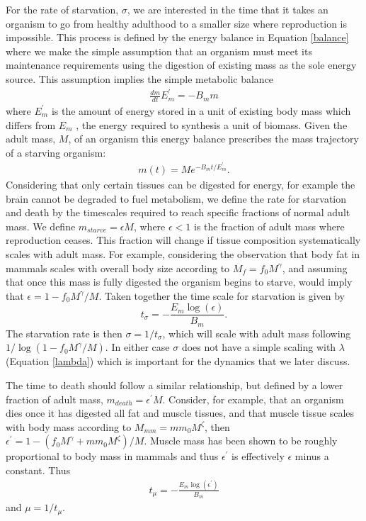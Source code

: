 \documentclass{pnastwo}
\begin{document}
\begin{article}
For the rate of starvation, $\sigma$, we are interested in the time that it takes an organism to go from healthy adulthood to a smaller size where reproduction is impossible. This process is defined by the energy balance in Equation \ref{balance} where we make the simple assumption that an organism must meet its maintenance requirements using the digestion of existing mass as the sole energy source. This assumption implies the simple metabolic balance 
\begin{eqnarray}
\frac{dm}{dt}E_{m}^{\prime}=-B_{m}m
\end{eqnarray}
where $E_{m}^{\prime}$ is the amount of energy stored in a unit of existing body mass which differs from $E_{m}$ \cite{}, the energy required to synthesis a unit of biomass. Given the adult mass, $M$, of an organism this energy balance prescribes the mass trajectory of a starving organism:
\begin{eqnarray}
m\left(t\right)=Me^{-B_{m}t/E_{m}^{\prime}}.
\end{eqnarray}
Considering that only certain tissues can be digested for energy, for example the brain cannot be degraded to fuel metabolism, we define the rate for starvation and death by the timescales required to reach specific fractions of normal adult mass. We define $m_{starve}=\epsilon M$, where $\epsilon<1$ is the fraction of adult mass where reproduction ceases. This fraction will change if tissue composition systematically scales with adult mass. For example, considering the observation that body fat in mammals scales with overall body size according to $M_{f}=f_{0}M^{\gamma}$, and assuming that once this mass is fully digested the organism begins to starve, would imply that $\epsilon=1-f_{0}M^{\gamma}/M$. Taken together the time scale for starvation is given by
\begin{equation}
\label{eq:sigma}
t_{\sigma}=-\frac{E_{m}\log\left(\epsilon\right)}{B_{m}}.
\end{equation}
The starvation rate is then $\sigma=1/t_{\sigma}$, which will scale with adult mass following $1/\log\left(1-f_{0}M^{\gamma}/M\right)$. In either case $\sigma$ does not have a simple scaling with $\lambda$ (Equation \ref{lambda}) which is important for the dynamics that we later discuss. 

The time to death should follow a similar relationship, but defined by a lower fraction of adult mass, $m_{death}=\epsilon^{\prime} M$. Consider, for example, that an organism dies once it has digested all fat and muscle tissues, and that muscle tissue scales with body mass according to $M_{mm}=mm_{0}M^{\zeta}$, then $\epsilon^{\prime}=1-\left(f_{0}M^{\gamma}+mm_{0}M^{\zeta}\right)/M$. Muscle mass has been shown to be roughly proportional to body mass \cite{muscle} in mammals and thus  $\epsilon^{\prime}$ is effectively $\epsilon$ minus a constant. Thus
\begin{eqnarray}
t_{\mu}=-\frac{E_{m}\log\left(\epsilon^{\prime}\right)}{B_{m}}
\end{eqnarray}
and $\mu=1/t_{\mu}$. 


\end{article}
\end{document}
